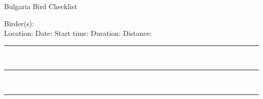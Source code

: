\documentclass{article}
\newcommand{\newnoteline}{\rule{\textwidth}{0.15mm}\\[1.5ex]}
\begin{document}
\centering
\LARGE{Bulgaria Bird Checklist}\\
\normalsize \raggedright


Birder(s): \underline{\hspace{112ex}}\\[1.5ex]
Location: \underline{\hspace{28ex}}    Date: \underline{\hspace{13ex}}    Start time: \underline{\hspace{10ex}}   Duration: \underline{\hspace{10ex}}    Distance: \underline{\hspace{10ex}}\\[1.5ex]


\newnoteline\newnoteline\newnoteline


\begin{center}


\end{center}
\end{document}
